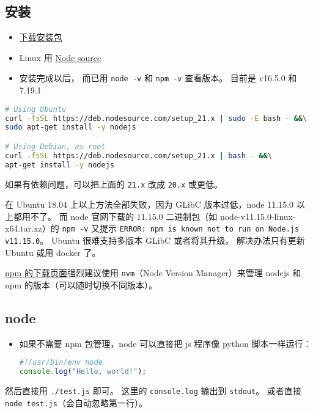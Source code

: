 
\begin{issues}
\issueDraft
\end{issues}


\subsection{安装}
\begin{itemize}
\item \href{https://nodejs.org/en/download/package-manager/}{下载安装包}
\item Linux 用 \href{https://github.com/nodesource/distributions/blob/master/README.md#installation-instructions}{Node source}
\item 安装完成以后， 而已用 \verb`node -v` 和 \verb`npm -v` 查看版本。 目前是 v16.5.0 和 7.19.1
\end{itemize}
\begin{lstlisting}[language=bash]
# Using Ubuntu
curl -fsSL https://deb.nodesource.com/setup_21.x | sudo -E bash - &&\
sudo apt-get install -y nodejs

# Using Debian, as root
curl -fsSL https://deb.nodesource.com/setup_21.x | bash - &&\
apt-get install -y nodejs
\end{lstlisting}
如果有依赖问题，可以把上面的 \verb`21.x` 改成 \verb`20.x` 或更低。

在 Ubuntu 18.04 上以上方法全部失败，因为 GLibC 版本过低，node 11.15.0 以上都用不了。 而 node 官网下载的 11.15.0 二进制包（如 node-v11.15.0-linux-x64.tar.xz）的 \verb`npm -v` 又提示 \verb`ERROR: npm is known not to run on Node.js v11.15.0`。 Ubuntu 很难支持多版本 GLibC 或者将其升级。 解决办法只有更新 Ubuntu 或用 docker 了。

\href{https://docs.npmjs.com/downloading-and-installing-node-js-and-npm}{npm 的下载页面}强烈建议使用 \verb`nvm`（Node Version Manager）来管理 nodejs 和 npm 的版本（可以随时切换不同版本）。

\subsection{node}
\begin{itemize}
\item 如果不需要 npm 包管理，node 可以直接把 js 程序像 python 脚本一样运行：
\begin{lstlisting}[language=js,caption=test.js]
#!/usr/bin/env node
console.log("Hello, world!");
\end{lstlisting}
\end{itemize}
然后直接用 \verb`./test.js` 即可。 这里的 \verb`console.log` 输出到 \verb`stdout`。 或者直接 \verb`node test.js`（会自动忽略第一行）。

